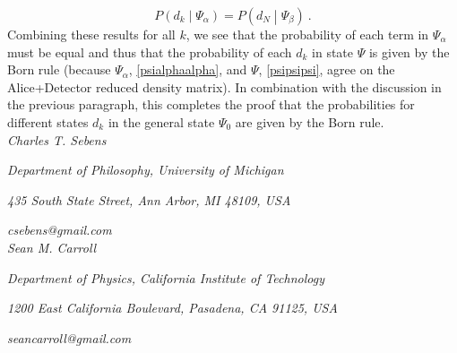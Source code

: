 \documentclass[onecolumn,secnumarabic,amsmath,amssymb,balancelastpage,nofootinbib]{article}
\begin{document}
\begin{equation}
P\left(d_k\middle|\Psi_\alpha\right)=P\left(d_N\middle|\Psi_\beta\right)\ .
\end{equation}
Combining these results for all $k$, we see that the probability of each term in $\Psi_\alpha$ must be equal and thus that the probability of each $d_k$ in state $\Psi$ is given by the Born rule (because $\Psi_\alpha$, \eqref{psialphaalpha}, and $\Psi$, \eqref{psipsipsi}, agree on the Alice+Detector reduced density matrix).  In combination with the discussion in the previous paragraph, this completes the proof that the probabilities for different states $d_k$ in the general state $\Psi_0$ are given by the Born rule.\\

\hfill \textit{Charles T. Sebens}

\hfill \textit{Department of Philosophy, University of Michigan}

\hfill \textit{435 South State Street, Ann Arbor, MI 48109, USA}

\hfill \textit{csebens@gmail.com}\\

\hfill \textit{Sean M. Carroll}

\hfill \textit{Department of Physics, California Institute of Technology}

\hfill \textit{1200 East California Boulevard, Pasadena, CA 91125, USA}

\hfill \textit{seancarroll@gmail.com}



\end{document}
